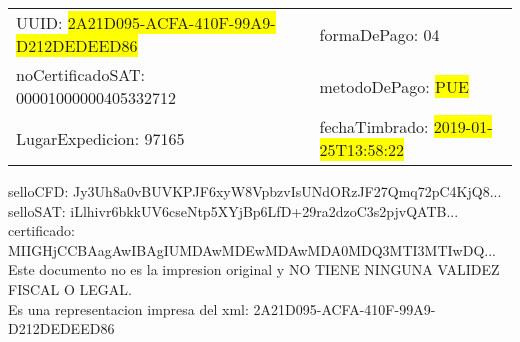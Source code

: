\documentclass{article}
\begin{document}
\begin{tabular}{p{11cm}p{1cm}p{8cm}}
\bigskip
UUID: \colorbox{yellow}{ 2A21D095-ACFA-410F-99A9-D212DEDEED86 } & & formaDePago: 04\\

noCertificadoSAT: 00001000000405332712 & & metodoDePago: \colorbox{yellow}{ PUE }\\

LugarExpedicion: 97165 & & fechaTimbrado: \colorbox{yellow}{ 2019-01-25T13:58:22 } \\
\end{tabular}

\bigskip
selloCFD: Jy3Uh8a0vBUVKPJF6xyW8VpbzvIsUNdORzJF27Qmq72pC4KjQ8... \\
selloSAT: iLlhivr6bkkUV6cseNtp5XYjBp6LfD+29ra2dzoC3s2pjvQATB... \\

certificado: MIIGHjCCBAagAwIBAgIUMDAwMDEwMDAwMDA0MDQ3MTI3MTIwDQ...\bigskip\bigskip\bigskip\bigskip\bigskip\bigskip
\\Este documento no es la impresion original y NO TIENE NINGUNA VALIDEZ FISCAL O LEGAL. \\
 Es una representacion impresa del xml:  2A21D095-ACFA-410F-99A9-D212DEDEED86 \\
\end{document}
